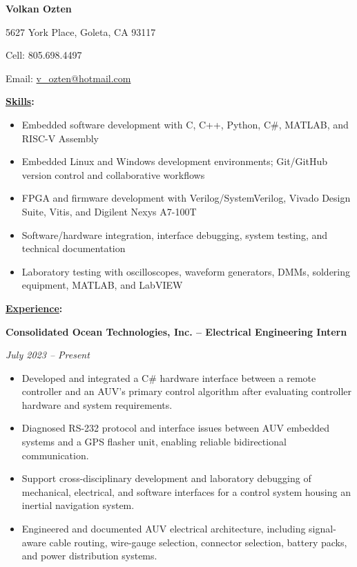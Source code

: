 \documentclass[letterpaper,10pt]{article}
\newcommand{\resumesection}[1]{%
  \vspace{6pt plus 1fill}%
  {\fontsize{11}{13}\selectfont\textbf{\underline{#1}:}}\par
  \vspace{3pt}%
}
\newcommand{\role}[2]{%
  {\fontsize{9.7}{12}\selectfont\textbf{#1}}\par
  {\fontsize{9.7}{12}\selectfont\textit{#2}}\par
}
\newenvironment{skillitems}{%
  \begin{itemize}[
    label=\textbullet,
    leftmargin=0.50in,
    labelsep=0.12in,
    itemsep=1.5pt,
    topsep=0pt,
    parsep=0pt,
    partopsep=0pt
  ]%
  \fontsize{9.7}{12}\selectfont
}{\end{itemize}}
\newenvironment{experienceitems}{%
  \begin{itemize}[
    label=\textbullet,
    leftmargin=1.50in,
    labelsep=0.12in,
    itemsep=1.5pt,
    topsep=0pt,
    parsep=0pt,
    partopsep=0pt
  ]%
  \fontsize{9.7}{12}\selectfont
}{\end{itemize}}
\begin{document}
{\fontsize{10.5}{13}\selectfont
\textbf{Volkan Ozten}\par
5627 York Place, Goleta, CA 93117\par
Cell: 805.698.4497\par
Email: \href{mailto:v_ozten@hotmail.com}{v\_ozten@hotmail.com}\par
}

\resumesection{Skills}
\begin{skillitems}
  \item Embedded software development with C, C++, Python, C\#, MATLAB, and RISC-V Assembly
  \item Embedded Linux and Windows development environments; Git/GitHub version control and collaborative workflows
  \item FPGA and firmware development with Verilog/SystemVerilog, Vivado Design Suite, Vitis, and Digilent Nexys A7-100T
  \item Software/hardware integration, interface debugging, system testing, and technical documentation
  \item Laboratory testing with oscilloscopes, waveform generators, DMMs, soldering equipment, MATLAB, and LabVIEW
\end{skillitems}

\resumesection{Experience}
\role{Consolidated Ocean Technologies, Inc. -- Electrical Engineering Intern}
     {July 2023 -- Present}
\begin{experienceitems}
  \item Developed and integrated a C\# hardware interface between a remote controller and an AUV's
        primary control algorithm after evaluating controller hardware and system requirements.
  \item Diagnosed RS-232 protocol and interface issues between AUV embedded systems and a GPS
        flasher unit, enabling reliable bidirectional communication.
  \item Support cross-disciplinary development and laboratory debugging of mechanical, electrical, and
        software interfaces for a control system housing an inertial navigation system.
  \item Engineered and documented AUV electrical architecture, including signal-aware cable routing,
        wire-gauge selection, connector selection, battery packs, and power distribution systems.
\end{experienceitems}
\end{document}
